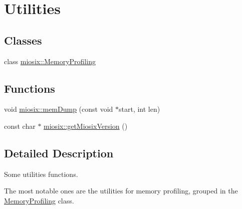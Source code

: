 \hypertarget{group___util}{\section{Utilities}
\label{group___util}
}
\subsection*{Classes}
\begin{DoxyCompactItemize}
\item 
class \hyperlink{classmiosix_1_1_memory_profiling}{miosix\-::\-Memory\-Profiling}
\end{DoxyCompactItemize}
\subsection*{Functions}
\begin{DoxyCompactItemize}
\item 
void \hyperlink{group___util_gadb6acdd9cbe72a6198e7b3b4c7d3d702}{miosix\-::mem\-Dump} (const void $\ast$start, int len)
\item 
const char $\ast$ \hyperlink{group___util_gadc3015d9be3c5eb12fe691ca0ca9251b}{miosix\-::get\-Miosix\-Version} ()
\end{DoxyCompactItemize}


\subsection{Detailed Description}
Some utilities functions.

The most notable ones are the utilities for memory profiling, grouped in the \hyperlink{classmiosix_1_1_memory_profiling}{Memory\-Profiling} class. 

